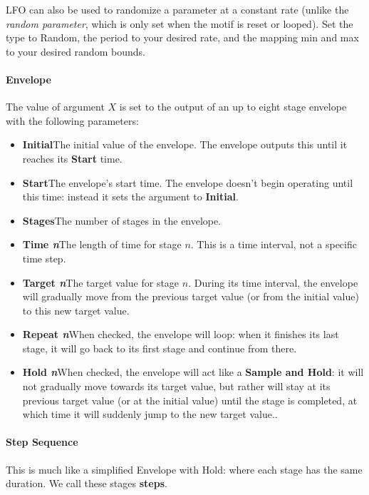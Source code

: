 \documentclass[twoside,10pt]{article}
\begin{document}
LFO can also be used to randomize a parameter at a constant rate (unlike the {\it random parameter}, which is only set when the motif is reset or looped).  Set the type to Random, the period to your desired rate, and the mapping min and max to your desired random bounds.

\paragraph{Envelope}

The value of argument \(X\) is set to the output of an up to eight stage envelope with the following parameters:

\begin{itemize}
\item {\bf Initial}\qquad The initial value of the envelope.   The envelope outputs this until it reaches its {\bf Start} time.
\item {\bf Start}\qquad The envelope's start time.  The envelope doesn't begin operating until this time: instead it sets the argument to {\bf Initial}.
\item {\bf Stages}\qquad The number of stages in the envelope.
\item {\bf Time \textit{n}}\qquad The length of time for stage \(n\).  This is a time interval, not a specific time step.
\item {\bf Target \textit{n}}\qquad The target value for stage \(n\).  During its time interval, the envelope will gradually move from the previous target value (or from the initial value) to this new target value.
\item {\bf Repeat \textit{n}}\qquad When checked, the envelope will loop: when it finishes its last stage, it will go back to its first stage and continue from there.
\item {\bf Hold \textit{n}}\qquad When checked, the envelope will act like a {\bf Sample and Hold}: it will not gradually move towards its target value, but rather will stay at its previous target value (or at the initial value) until the stage is completed, at which time it will suddenly jump to the new target value..
\end{itemize}

\paragraph{Step Sequence}

This is much like a simplified Envelope with Hold: where each stage has the same duration.   We call these stages {\bf steps}.
\end{document}
